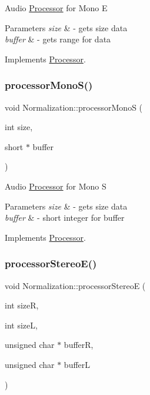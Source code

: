 Audio \hyperlink{classProcessor}{Processor} for Mono E 
\begin{DoxyParams}{Parameters}
{\em size} & -\/ gets size data \\
\hline
{\em buffer} & -\/ gets range for data \\
\hline
\end{DoxyParams}


Implements \hyperlink{classProcessor_aa9742b5df48a3c6442d521ce93012fc1}{Processor}.

\mbox{\label{classNormalization_a432fc3b7ef40314bb4d7a215fddc8d0b}} 
\subsubsection{\texorpdfstring{processor\+Mono\+S()}{processorMonoS()}}
{\footnotesize\ttfamily void Normalization\+::processor\+MonoS (\begin{DoxyParamCaption}\item[{int}]{size,  }\item[{short $\ast$}]{buffer }\end{DoxyParamCaption})\hspace{0.3cm}{\ttfamily [virtual]}}

Audio \hyperlink{classProcessor}{Processor} for Mono S 
\begin{DoxyParams}{Parameters}
{\em size} & -\/ gets size data \\
\hline
{\em buffer} & -\/ short integer for buffer \\
\hline
\end{DoxyParams}


Implements \hyperlink{classProcessor_a4cf32c9f7e26383490e8fb49defcc287}{Processor}.

\mbox{\label{classNormalization_a27a14c9e1a86b55db654335e79c89782}} 
\subsubsection{\texorpdfstring{processor\+Stereo\+E()}{processorStereoE()}}
{\footnotesize\ttfamily void Normalization\+::processor\+StereoE (\begin{DoxyParamCaption}\item[{int}]{sizeR,  }\item[{int}]{sizeL,  }\item[{unsigned char $\ast$}]{bufferR,  }\item[{unsigned char $\ast$}]{bufferL }\end{DoxyParamCaption})\hspace{0.3cm}{\ttfamily [virtual]}}

